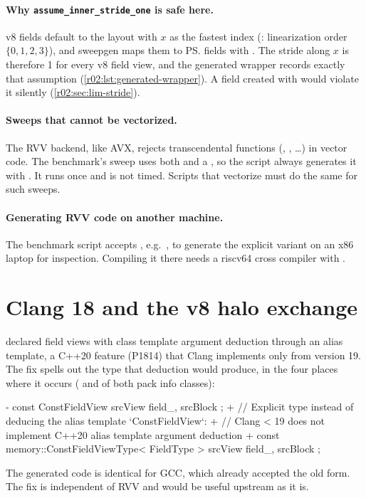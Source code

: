 \paragraph{Why \texttt{assume\_inner\_stride\_one} is safe here.}
v8 fields default to the  layout with $x$ as the fastest index
(: linearization order $\{0,1,2,3\}$), and sweepgen maps them to
\ps{} fields with . The stride along $x$ is therefore 1 for
every v8 field view, and the generated wrapper records exactly that assumption
(\cref{r02:lst:generated-wrapper}). A field created with  would violate it
silently (\cref{r02:sec:lim-stride}).

\paragraph{Sweeps that cannot be vectorized.}
The RVV backend, like AVX, rejects transcendental functions (, ,
\dots) in vector code. The benchmark's  sweep uses both and a
, so the script always generates it with . It
runs once and is not timed. Scripts that vectorize must do the same for such sweeps.

\paragraph{Generating RVV code on another machine.}
The benchmark script accepts , e.g.\
, to generate the explicit variant on an x86 laptop
for inspection. Compiling it there needs a riscv64 cross compiler with
\code{-march=rv64gcv_zvl256b}.

\section{Clang 18 and the v8 halo exchange}\label{r02:sec:wlb-clang}

 declared field views with class template argument
deduction through an alias template, a C++20 feature (P1814) that Clang implements only
from version 19. The fix spells out the type that deduction would produce, in the four
places where it occurs (\code{pack} and \code{localCopy} of both pack info classes):
\rneedspace{12\baselineskip}
\begin{diffcode}[nolol=false,caption={[Clang 18 fix in the v8 pack infos]Clang 18 fix in \texttt{GenericFieldPackInfos.hpp} (one of four identical changes).},label=r02:lst:clang-fix]
-      const ConstFieldView srcView{ field_, srcBlock };
+      //  Explicit type instead of deducing the alias template `ConstFieldView`:
+      //  Clang < 19 does not implement C++20 alias template argument deduction
+      const memory::ConstFieldViewType< FieldType > srcView{ field_, srcBlock };
\end{diffcode}
The generated code is identical for GCC, which already accepted the old form. The fix
is independent of RVV and would be useful upstream as it is.

